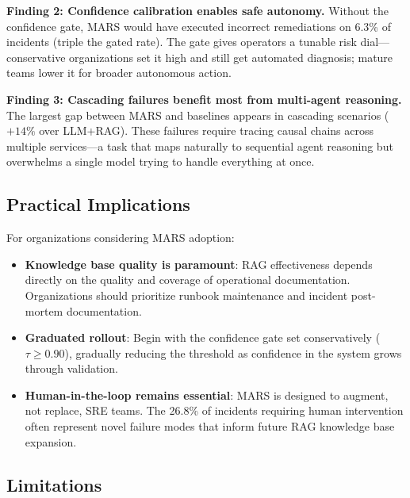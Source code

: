 \documentclass[journal]{IEEEtran}
\begin{document}
\textbf{Finding 2: Confidence calibration enables safe autonomy.} Without the confidence gate, MARS would have executed incorrect remediations on 6.3\% of incidents (triple the gated rate). The gate gives operators a tunable risk dial---conservative organizations set it high and still get automated diagnosis; mature teams lower it for broader autonomous action.

\textbf{Finding 3: Cascading failures benefit most from multi-agent reasoning.} The largest gap between MARS and baselines appears in cascading scenarios ($+14\%$ over LLM+RAG). These failures require tracing causal chains across multiple services---a task that maps naturally to sequential agent reasoning but overwhelms a single model trying to handle everything at once.

\subsection{Practical Implications}

For organizations considering MARS adoption:
\begin{itemize}
    \item \textbf{Knowledge base quality is paramount}: RAG effectiveness depends directly on the quality and coverage of operational documentation. Organizations should prioritize runbook maintenance and incident post-mortem documentation.
    \item \textbf{Graduated rollout}: Begin with the confidence gate set conservatively ($\tau \geq 0.90$), gradually reducing the threshold as confidence in the system grows through validation.
    \item \textbf{Human-in-the-loop remains essential}: MARS is designed to augment, not replace, SRE teams. The 26.8\% of incidents requiring human intervention often represent novel failure modes that inform future RAG knowledge base expansion.
\end{itemize}

\subsection{Limitations}
\end{document}
